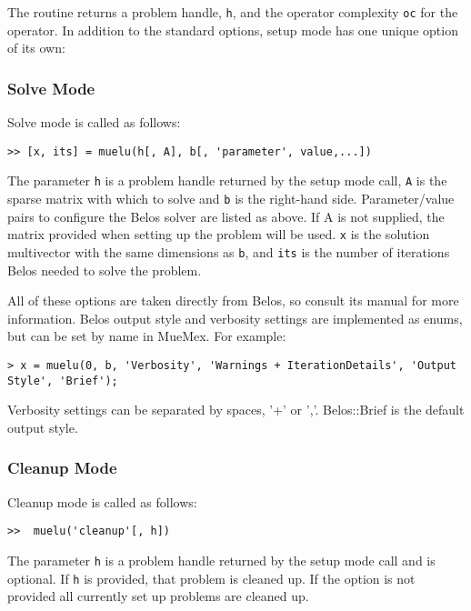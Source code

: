 The routine returns a problem handle, \texttt{h}, and the operator
complexity \texttt{oc} for the operator.  In addition to the standard
options, setup mode has one unique option of its own:


\subsubsection{Solve Mode}
Solve mode is called as follows:
\begin{verbatim}
>> [x, its] = muelu(h[, A], b[, 'parameter', value,...])
\end{verbatim}
The parameter \texttt{h} is a problem handle returned by the
setup mode call, \texttt{A} is the sparse matrix with which to
solve and \texttt{b} is the right-hand side.  Parameter/value pairs
to configure the Belos solver are listed as above. If A is not supplied,
the matrix provided when setting up the problem will be used. \texttt{x} is
the solution multivector with the same dimensions as \texttt{b}, and \texttt{its}
is the number of iterations Belos needed to solve the problem.

All of these options are taken directly from Belos, so consult its
manual for more information. Belos output style and verbosity settings
are implemented as enums, but can be set by name in MueMex. For example:

\begin{verbatim}
> x = muelu(0, b, 'Verbosity', 'Warnings + IterationDetails', 'Output Style', 'Brief');
\end{verbatim}

Verbosity settings can be separated by spaces, '+' or ','. Belos::Brief
is the default output style.

\subsubsection{Cleanup Mode}
Cleanup mode is called as follows:
\begin{verbatim}
>>  muelu('cleanup'[, h])
\end{verbatim}
The parameter \texttt{h} is a problem handle returned by the
setup mode call and is optional.  If \texttt{h} is provided, that
problem is cleaned up.  If the option is not provided all currently
set up problems are cleaned up.

